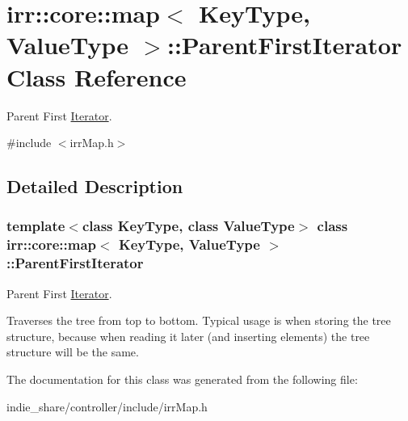 \hypertarget{classirr_1_1core_1_1map_1_1ParentFirstIterator}{}\section{irr\+:\+:core\+:\+:map$<$ Key\+Type, Value\+Type $>$\+:\+:Parent\+First\+Iterator Class Reference}
\label{classirr_1_1core_1_1map_1_1ParentFirstIterator}


Parent First \hyperlink{classirr_1_1core_1_1map_1_1Iterator}{Iterator}.  




{\ttfamily \#include $<$irr\+Map.\+h$>$}



\subsection{Detailed Description}
\subsubsection*{template$<$class Key\+Type, class Value\+Type$>$\newline
class irr\+::core\+::map$<$ Key\+Type, Value\+Type $>$\+::\+Parent\+First\+Iterator}

Parent First \hyperlink{classirr_1_1core_1_1map_1_1Iterator}{Iterator}. 

Traverses the tree from top to bottom. Typical usage is when storing the tree structure, because when reading it later (and inserting elements) the tree structure will be the same. 

The documentation for this class was generated from the following file\+:\begin{DoxyCompactItemize}
\item 
indie\+\_\+share/controller/include/irr\+Map.\+h\end{DoxyCompactItemize}

